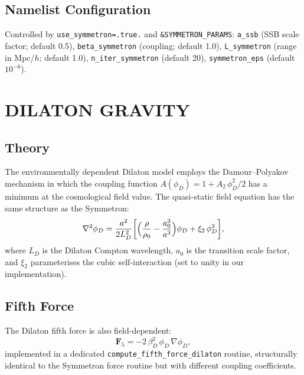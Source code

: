 \documentclass[fleqn,usenatbib]{mnras}
\newcommand{\code}[1]{\texttt{#1}}
\begin{document}
\subsection{Namelist Configuration}

Controlled by \code{use\_symmetron=.true.} and
\code{\&SYMMETRON\_PARAMS}:
\code{a\_ssb} (SSB scale factor; default 0.5),
\code{beta\_symmetron} (coupling; default 1.0),
\code{L\_symmetron} (range in Mpc/$h$; default 1.0),
\code{n\_iter\_symmetron} (default 20),
\code{symmetron\_eps} (default $10^{-6}$).


\section{DILATON GRAVITY}
\label{sec:dilaton}

\subsection{Theory}

The environmentally dependent Dilaton model
\citep{Brax2010,Brax2011} employs the Damour--Polyakov mechanism in
which the coupling function $A(\phi_D) = 1 + A_2\,\phi_D^2/2$ has a
minimum at the cosmological field value.  The quasi-static field
equation has the same structure as the Symmetron:
\begin{equation}
\nabla^2\phi_D = \frac{a^2}{2L_D^2}
  \biggl[\Bigl(\frac{\rho}{\rho_0}
    - \frac{a_0^3}{a^3}\Bigr)\phi_D
  + \xi_2\,\phi_D^3\biggr],
\label{eq:dilaton_eom}
\end{equation}
where $L_D$ is the Dilaton Compton wavelength, $a_0$ is the
transition scale factor, and $\xi_2$ parameterises the cubic
self-interaction (set to unity in our implementation).

\subsection{Fifth Force}

The Dilaton fifth force is also field-dependent:
\begin{equation}
\mathbf{F}_5 = -2\,\beta_D^2\,\phi_D\,\nabla\phi_D,
\label{eq:dilaton_force}
\end{equation}
implemented in a dedicated \code{compute\_fifth\_force\_dilaton}
routine, structurally identical to the Symmetron force routine but
with different coupling coefficients.
\end{document}
